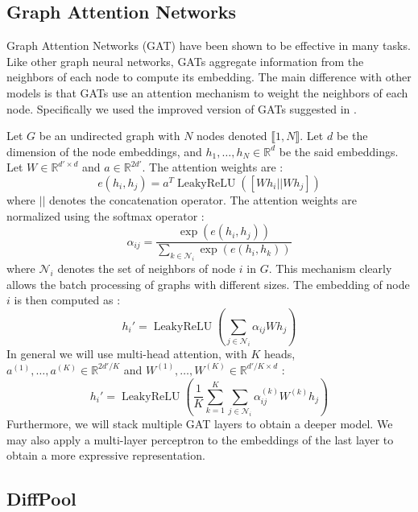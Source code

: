 \documentclass[switch, 12pt]{article}
\DeclareMathOperator{\leakyrelu}{LeakyReLU}
\newcommand{\R}{\mathbb{R}}
\begin{document}
\begin{multicols}{2}
    \subsection{Graph Attention Networks}

    Graph Attention Networks (GAT) \cite{velickovic-2018} have been shown to be effective in many tasks. Like other graph neural networks, GATs aggregate information from the neighbors of each node to compute its embedding. The main difference with other models is that GATs use an attention mechanism to weight the neighbors of each node. Specifically we used the improved version of GATs suggested in \cite{brody-2021}.

    Let $G$ be an undirected graph with $N$ nodes denoted $\llbracket1, N\rrbracket$. Let $d$ be the dimension of the node embeddings, and $h_1,\dots,h_N\in\R^d$ be the said embeddings. Let $W\in\R^{d'\times d}$ and $a\in\R^{2d'}$. The attention weights are :
    \begin{equation}
        e(h_i,h_j) = a^T \leakyrelu([Wh_i || Wh_j])
    \end{equation}
    where $||$ denotes the concatenation operator. The attention weights are normalized using the softmax operator :
    \begin{equation}
        \alpha_{ij} = \frac{\exp(e(h_i,h_j))}{\sum_{k\in\mathcal{N}_i}\exp(e(h_i,h_k))}
    \end{equation}
    where $\mathcal{N}_i$ denotes the set of neighbors of node $i$ in $G$. This mechanism clearly allows the batch processing of graphs with different sizes. The embedding of node $i$ is then computed as :
    \begin{equation}
        h_i' = \leakyrelu\left(\sum_{j\in\mathcal{N}_i}\alpha_{ij}Wh_j\right)
    \end{equation}
    In general we will use multi-head attention, with $K$ heads, $a^{(1)},\dots,a^{(K)}\in\R^{2d'/K}$ and $W^{(1)},\dots,W^{(K)}\in\R^{d'/K\times d}$ :
    \begin{equation}
        h_i' = \leakyrelu\left(\frac{1}{K}\sum_{k=1}^K\sum_{j\in\mathcal{N}_i}\alpha_{ij}^{(k)}W^{(k)}h_j\right)
    \end{equation}
    Furthermore, we will stack multiple GAT layers to obtain a deeper model. We may also apply a multi-layer perceptron to the embeddings of the last layer to obtain a more expressive representation.


    \subsection{DiffPool}


\end{multicols}
\end{document}
